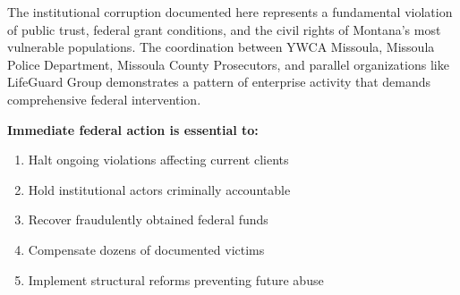 \documentclass[11pt,letterpaper]{article}
\begin{document}
\begin{center}
\end{center}

\vspace{0.3in}

The institutional corruption documented here represents a fundamental violation of public trust, federal grant conditions, and the civil rights of Montana's most vulnerable populations. The coordination between YWCA Missoula, Missoula Police Department, Missoula County Prosecutors, and parallel organizations like LifeGuard Group demonstrates a pattern of enterprise activity that demands comprehensive federal intervention.

\vspace{0.2in}

\textbf{Immediate federal action is essential to:}
\begin{enumerate}[leftmargin=*]
\item Halt ongoing violations affecting current clients
\item Hold institutional actors criminally accountable
\item Recover fraudulently obtained federal funds
\item Compensate dozens of documented victims
\item Implement structural reforms preventing future abuse
\end{enumerate}
\end{document}
